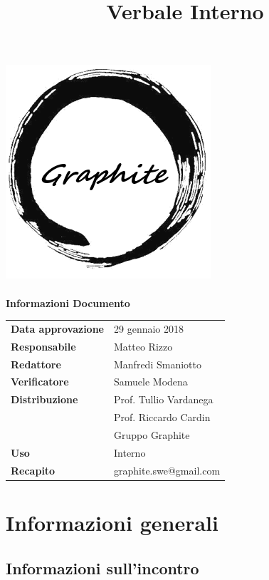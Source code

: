 \documentclass[openany,12pt,a4paper]{article}
\title{Verbale Interno}
\author{}
\begin{document}
	\makeatletter
	\begin{titlepage}
		\setlength{\headsep}{0pt}  
		\begin{center}
			\includegraphics[width=0.5\linewidth]{Logo.png}\\[1em]
			{\huge \bfseries  \@title }\\[10ex]
			\textbf{\Large Informazioni Documento} \\[2em]
			\bgroup
			\def\arraystretch{1.5}
			\begin{tabular}{l|l}
				\textbf{Data approvazione} & 29 gennaio 2018 \\
				\textbf{Responsabile} & Matteo Rizzo \\
				\textbf{Redattore} & Manfredi Smaniotto \\
				\textbf{Verificatore} & Samuele Modena \\
				\textbf{Distribuzione} & Prof. Tullio Vardanega \\
				 & Prof. Riccardo Cardin \\
				 & Gruppo Graphite \\
				\textbf{Uso} & Interno \\
				\textbf{Recapito} & graphite.swe@gmail.com \\
			\end{tabular}
		\egroup
		\end{center}
	\end{titlepage}
	\makeatother

	\thispagestyle{empty}
	\newpage
	
	\tableofcontents
	\newpage
	
	\section{Informazioni generali}
	
	\subsection{Informazioni sull'incontro}
	
\end{document}
